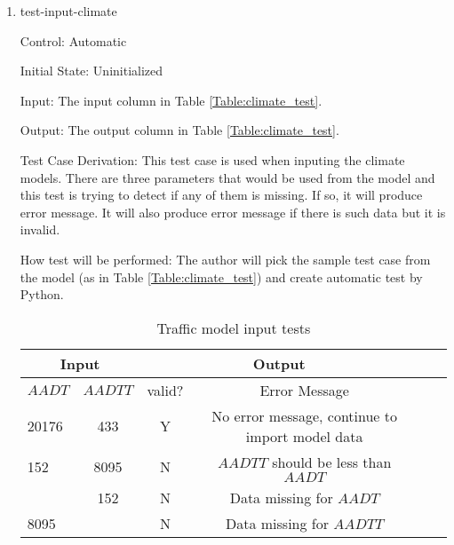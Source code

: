 \documentclass[12pt, titlepage]{article}
\begin{document}
\begin{enumerate}

\item{test-input-climate\\}

Control: Automatic
					
Initial State: Uninitialized
					
Input: The input column in Table \ref{Table:climate_test}.
					
Output: The output column in Table \ref{Table:climate_test}. 

Test Case Derivation: This test case is used when inputing the climate models. There are three parameters that would be used from the model and this test is trying to detect if any of them is missing. If so, it will produce error message. It will also produce error message if there is such data but it is invalid. 
					
How test will be performed: The author will pick the sample test case from the model (as in Table \ref{Table:climate_test}) and create automatic test by Python.



\begin{center}
\begin{table}[h]
\resizebox{\textwidth}{!}
{ %
    \begin{tabular}{ lc|cccc }
    \hline
      \multicolumn{2}{c|}{Input }     & \multicolumn{2}{c}{Output} \\ 
    
    \hline

        $AADT$   &   $AADTT$   &   valid?   &   Error Message \\ \hline
    
       20176  & 433 &   Y  &  No error message, continue to import model data          \\      \hline
       152  & 8095 &   N  & $AADTT$ should be less than $AADT$                        \\      \hline
         & 152 &   N  & Data missing for $AADT$                        \\      \hline
       8095 & &   N  & Data missing for $AADTT$                        \\      \hline
    
    \end{tabular} %
}
\caption{Traffic model input tests}
\label{Table:traffic_test}
\end{table}
\end{center}


\end{enumerate}
\end{document}

